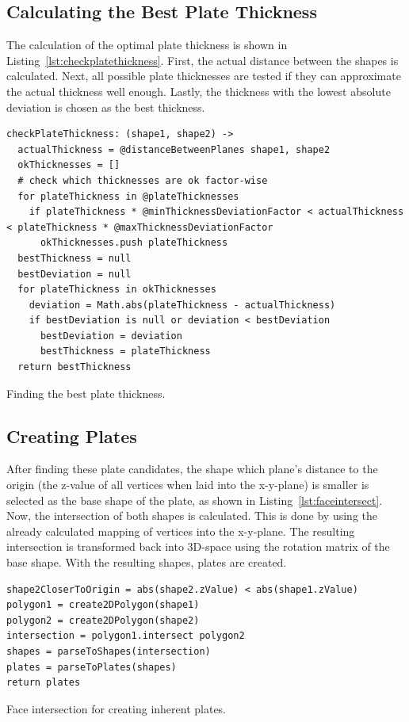 \documentclass[../ClassicThesis.tex]{subfiles}
\begin{document}
\subsection{Calculating the Best Plate Thickness}

The calculation of the optimal plate thickness is shown in Listing~\ref{lst:checkplatethickness}. First, the actual distance between the shapes is calculated. Next, all possible plate thicknesses are tested if they can approximate the actual thickness well enough. Lastly, the thickness with the lowest absolute deviation is chosen as the best thickness.

\begin{listing}
\begin{verbatim}
checkPlateThickness: (shape1, shape2) ->
  actualThickness = @distanceBetweenPlanes shape1, shape2
  okThicknesses = []
  # check which thicknesses are ok factor-wise
  for plateThickness in @plateThicknesses
    if plateThickness * @minThicknessDeviationFactor < actualThickness < plateThickness * @maxThicknessDeviationFactor
      okThicknesses.push plateThickness
  bestThickness = null
  bestDeviation = null
  for plateThickness in okThicknesses
    deviation = Math.abs(plateThickness - actualThickness)
    if bestDeviation is null or deviation < bestDeviation
      bestDeviation = deviation
      bestThickness = plateThickness
  return bestThickness
\end{verbatim}
\caption{Finding the best plate thickness.}
\label{lst:checkplatethickness}
\end{listing}

\subsection{Creating Plates}

After finding these plate candidates, the shape which plane's distance to the origin (the z-value of all vertices when laid into the x-y-plane) is smaller is selected as the base shape of the plate, as shown in Listing~\ref{lst:faceintersect}. Now, the intersection of both shapes is calculated. This is done by using the already calculated mapping of vertices into the x-y-plane. The resulting intersection is transformed back into 3D-space using the rotation matrix of the base shape. With the resulting shapes, plates are created.

\begin{listing}
\begin{verbatim}
shape2CloserToOrigin = abs(shape2.zValue) < abs(shape1.zValue)
polygon1 = create2DPolygon(shape1)
polygon2 = create2DPolygon(shape2)
intersection = polygon1.intersect polygon2
shapes = parseToShapes(intersection)
plates = parseToPlates(shapes)
return plates
\end{verbatim}
\caption{Face intersection for creating inherent plates.}
\label{lst:faceintersect}
\end{listing}
\end{document}
